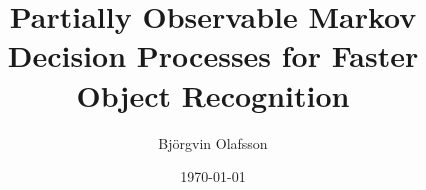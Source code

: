 \documentclass[a4paper,11pt]{kth-mag} %
\title{Partially Observable Markov Decision Processes for Faster Object Recognition}
\author{Björgvin Olafsson}
\date{\today}
\begin{document}
\frontmatter
\pagestyle{empty}
\removepagenumbers

\maketitle




\tableofcontents*

\mainmatter








\renewcommand{\bibname}{References}




\appendix
\addappheadtotoc



\clearpage
\thispagestyle{empty}

\end{document}
